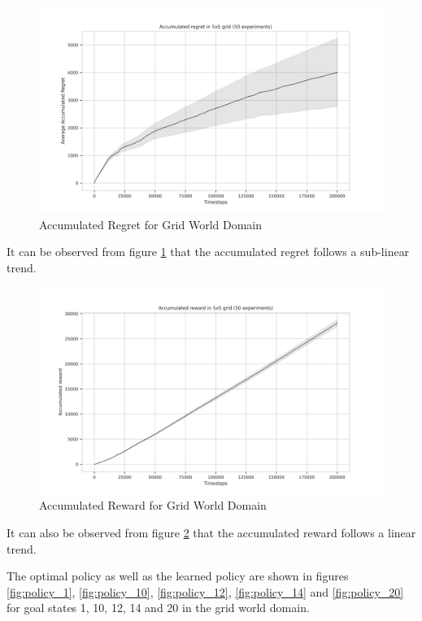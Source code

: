 \begin{figure}[!htbp]
    \centering
    \includegraphics[width=\linewidth]{experimentation/images/Accumulated regret in 5x5 grid (50 experiments).png}
    \caption{Accumulated Regret for Grid World Domain}
    \label{fig:regret}
\end{figure}

It can be observed from figure \ref{fig:regret} that the accumulated regret follows a sub-linear trend.

\begin{figure}[!htbp]
    \centering
    \includegraphics[width=\linewidth]{experimentation/images/Accumulated reward in 5x5 grid (50 experiments).png}
    \caption{Accumulated Reward for Grid World Domain}
    \label{fig:reward}
\end{figure}

It can also be observed from figure \ref{fig:reward} that the accumulated reward follows a linear trend.

The optimal policy as well as the learned policy are shown in figures \ref{fig:policy_1}, \ref{fig:policy_10}, \ref{fig:policy_12}, \ref{fig:policy_14} and \ref{fig:policy_20} for goal states 1, 10, 12, 14 and 20 in the grid world domain.

